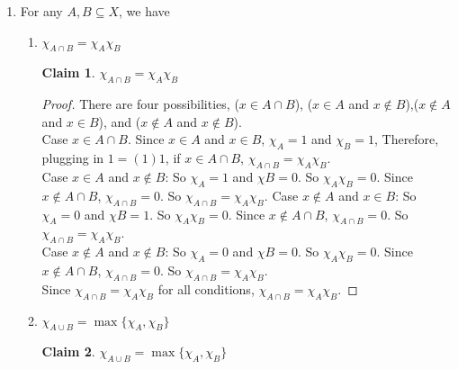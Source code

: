 \documentclass[11pt]{letter}
\newtheorem{claim}{Claim}
\theoremstyle{definition}
\begin{document}
\begin{enumerate}
\begin{enumerate}
\begin{proof}
            Case $j\in A$ and $j\notin B$. Therefore $\chi_A(x)=1$ and $\chi_B(x)=0$. Since this implies $0=1$, $A\neq b$ cannot be true.\\
            Case $j\in B$ and $j\notin A$. Therefore $\chi_B(x)=1$ and $\chi_A(x)=0$. Since this implies $0=1$, $A\neq b$ cannot be true.\\
            Therefore, by contradiction, $A=B$. So $\chi_A=\chi_B$ iff $A=B$.
          \end{proof}          
	\end{enumerate}
      \item For any $A,B\subseteq X$, we have
	\begin{enumerate}
	\item  $\chi_{A\cap B}=\chi_A\chi_B$
          \begin{claim}
            $\chi_{A\cap B}=\chi_A\chi_B$
          \end{claim}
          \begin{proof}
            There are four possibilities, ($x\in A\cap B$), ($x\in A$ and $x\notin B$),($x\notin A$ and $x\in B$), and ($x\notin A$ and $x\notin B$).\\
            Case $x\in A\cap B$. Since $x\in A$ and $x\in B$, $\chi_{A}=1$ and $\chi_{B}=1$, Therefore, plugging in $1=(1)1$, if $x\in A\cap B$, $\chi_{A\cap B}=\chi_A\chi_B$.\\
            Case $x\in A$ and $x\notin B$: So $\chi_{A}=1$ and $\chi{B}=0$. So $\chi_{A}\chi_B=0$. Since $x\notin A\cap B$, $\chi_{A\cap B}=0$. So $\chi_{A\cap B}=\chi_A\chi_B$.
            Case $x\notin A$ and $x\in B$: So $\chi_{A}=0$ and $\chi{B}=1$. So $\chi_{A}\chi_B=0$. Since $x\notin A\cap B$, $\chi_{A\cap B}=0$. So $\chi_{A\cap B}=\chi_A\chi_B$.\\
            Case $x\notin A$ and $x\notin B$: So $\chi_{A}=0$ and $\chi{B}=0$. So $\chi_{A}\chi_B=0$. Since $x\notin A\cap B$, $\chi_{A\cap B}=0$. So $\chi_{A\cap B}=\chi_A\chi_B$.\\
            Since $\chi_{A\cap B}=\chi_A\chi_B$ for all conditions, $\chi_{A\cap B}=\chi_A\chi_B$.
          \end{proof}
	\item  $\chi_{A\cup B}=\max\{\chi_A,\chi_B\}$
          \begin{claim}
            $\chi_{A\cup B}=\max\{\chi_A,\chi_B\}$
          \end{claim}
          

\end{enumerate}
\end{enumerate}
\end{document}
